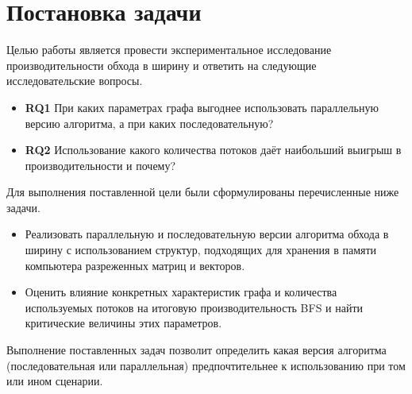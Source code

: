 
\section{Постановка задачи}
\label{sec:task}
Целью работы является провести экспериментальное исследование производительности обхода в ширину и ответить на следующие исследовательские вопросы. 
 
\begin{itemize}
    \item{\textbf{RQ1}\label{rq1}} \newline
    При каких параметрах графа выгоднее использовать параллельную версию алгоритма, а при каких последовательную?
    \item{\textbf{RQ2}\label{rq2}} \newline
    Использование какого количества потоков даёт наибольший выигрыш в производительности и почему?
\end{itemize}

 Для выполнения поставленной цели были сформулированы перечисленные ниже задачи.
 \begin{itemize}
 	\item Реализовать параллельную и последовательную версии алгоритма обхода в ширину с использованием структур, подходящих для хранения в памяти компьютера разреженных матриц и векторов.
 	\item  Оценить влияние конкретных характеристик графа и количества используемых потоков на итоговую производительность BFS и найти критические величины этих параметров.
 \end{itemize}

Выполнение поставленных задач позволит определить какая версия алгоритма (последовательная или параллельная) предпочтительнее к использованию при том или ином сценарии.
